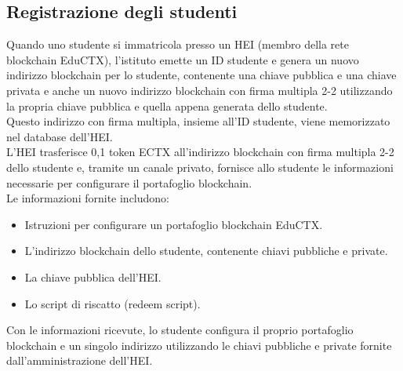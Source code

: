 \subsection{Registrazione degli studenti}
Quando uno studente si immatricola presso un HEI (membro della rete blockchain EduCTX), l'istituto emette un ID studente e genera un nuovo indirizzo blockchain per lo studente, contenente una chiave pubblica e una chiave privata
e anche un nuovo indirizzo blockchain con firma multipla 2-2 utilizzando la propria chiave pubblica e quella appena generata dello studente. 
\\Questo indirizzo con firma multipla, insieme all'ID studente, viene memorizzato nel database dell'HEI.
\\L'HEI trasferisce 0,1 token ECTX all'indirizzo blockchain con firma multipla 2-2 dello studente e, tramite un canale privato, fornisce allo studente le informazioni necessarie per configurare il portafoglio blockchain. 
\\Le informazioni fornite includono:
\begin{itemize}
    \item Istruzioni per configurare un portafoglio blockchain EduCTX.
    \item L'indirizzo blockchain dello studente, contenente chiavi pubbliche e private.
    \item La chiave pubblica dell'HEI.
    \item Lo script di riscatto (redeem script).
\end{itemize}
Con le informazioni ricevute, lo studente configura il proprio portafoglio blockchain e un singolo indirizzo utilizzando le chiavi pubbliche e private fornite dall'amministrazione dell'HEI.
